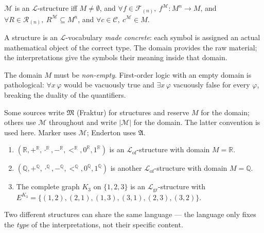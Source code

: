 \begin{remark*}
$\mathcal{M}$ is an $\mathcal{L}$-structure iff
$M \neq \emptyset$,
and $\forall f \in \mathcal{F}_{(n)},\ f^{\mathcal{M}} : M^n \to M$,
and $\forall R \in \mathcal{R}_{(n)},\ R^{\mathcal{M}} \subseteq M^n$,
and $\forall c \in \mathcal{C},\ c^{\mathcal{M}} \in M$.
\end{remark*}

\begin{remark*}[Intuition]
A structure is an $\mathcal{L}$-vocabulary \emph{made concrete}: each
symbol is assigned an actual mathematical object of the correct type.
The domain provides the raw material; the interpretations give the
symbols their meaning inside that domain.
\end{remark*}

\begin{remark*}
The domain $M$ must be \emph{non-empty}. First-order logic with an empty
domain is pathological: $\forall x\, \varphi$ would be vacuously true
and $\exists x\, \varphi$ vacuously false for every $\varphi$, breaking
the duality of the quantifiers.
\end{remark*}

\begin{remark*}
Some sources write $\mathfrak{M}$ (Fraktur) for structures and reserve
$M$ for the domain; others use $\mathcal{M}$ throughout and write
$|\mathcal{M}|$ for the domain. The latter convention is used here.
Marker uses $\mathcal{M}$; Enderton uses $\mathfrak{A}$.
\end{remark*}


\begin{example}
\begin{enumerate}
  \item $(\mathbb{R}, +^{\mathbb{R}}, \cdot^{\mathbb{R}}, -^{\mathbb{R}},
         <^{\mathbb{R}}, 0^{\mathbb{R}}, 1^{\mathbb{R}})$
        is an $\mathcal{L}_{\mathrm{of}}$-structure with domain
        $M = \mathbb{R}$.

  \item $(\mathbb{Q}, +^{\mathbb{Q}}, \cdot^{\mathbb{Q}}, -^{\mathbb{Q}},
         <^{\mathbb{Q}}, 0^{\mathbb{Q}}, 1^{\mathbb{Q}})$
        is another $\mathcal{L}_{\mathrm{of}}$-structure with domain
        $M = \mathbb{Q}$.

  \item The complete graph $K_3$ on $\{1,2,3\}$ is an
        $\mathcal{L}_{\mathrm{gr}}$-structure with
        $E^{K_3} = \{(1,2),(2,1),(1,3),(3,1),(2,3),(3,2)\}$.
\end{enumerate}
Two different structures can share the same language — the language only
fixes the \emph{type} of the interpretations, not their specific content.
\end{example}

